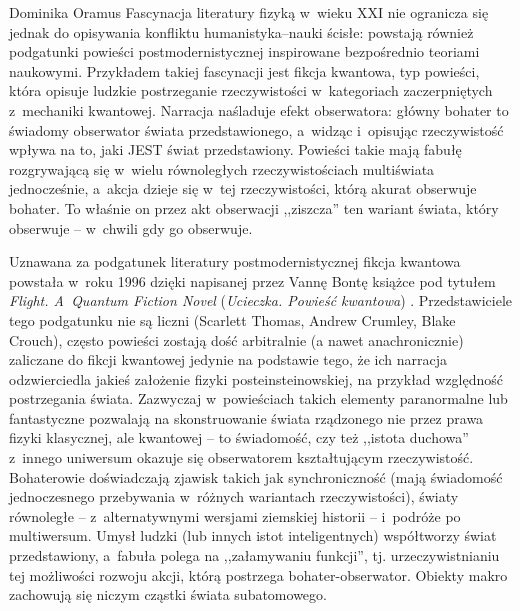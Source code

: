 \begin{artplenv}{Dominika Oramus}
Fascynacja literatury fizyką w~wieku XXI nie ogranicza się jednak do opisywania konfliktu humanistyka--nauki ścisłe: powstają również podgatunki powieści postmodernistycznej inspirowane bezpośrednio teoriami naukowymi. Przykładem takiej fascynacji jest fikcja kwantowa, typ powieści, która opisuje ludzkie postrzeganie rzeczywistości w~kategoriach zaczerpniętych z~mechaniki kwantowej. Narracja naśladuje efekt obserwatora: główny bohater to świadomy obserwator świata przedstawionego, a~widząc i~opisując rzeczywistość wpływa na to, jaki JEST świat przedstawiony. Powieści takie mają fabułę rozgrywającą się w~wielu równoległych rzeczywistościach multiświata jednocześnie, a~akcja dzieje się w~tej rzeczywistości, którą akurat obserwuje bohater. To właśnie on przez akt obserwacji ,,ziszcza'' ten wariant świata, który obserwuje -- w~chwili gdy go obserwuje.

Uznawana za podgatunek literatury postmodernistycznej fikcja kwantowa powstała w~roku 1996 dzięki napisanej przez Vannę Bontę książce pod tytułem \textit{Flight. A~Quantum Fiction Novel} (\textit{Ucieczka. Powieść kwantowa})
\parencite*[][]{brockman_trzecia_1996}. %
 Przedstawiciele tego podgatunku nie są liczni (Scarlett Thomas, Andrew Crumley, Blake Crouch), często powieści zostają dość arbitralnie (a nawet anachronicznie) zaliczane do fikcji kwantowej jedynie na podstawie tego, że ich narracja odzwierciedla jakieś założenie fizyki posteinsteinowskiej, na przykład względność postrzegania świata. Zazwyczaj w~powieściach takich elementy paranormalne lub fantastyczne pozwalają na skonstruowanie świata rządzonego nie przez prawa fizyki klasycznej, ale kwantowej -- to świadomość, czy też ,,istota duchowa'' z~innego uniwersum okazuje się obserwatorem kształtującym rzeczywistość. Bohaterowie doświadczają zjawisk takich jak synchroniczność (mają świadomość jednoczesnego przebywania w~różnych wariantach rzeczywistości), światy równoległe -- z~alternatywnymi wersjami ziemskiej historii -- i~podróże po multiwersum. Umysł ludzki (lub innych istot inteligentnych) współtworzy świat przedstawiony, a~fabuła polega na ,,załamywaniu funkcji'', tj. urzeczywistnianiu tej możliwości rozwoju akcji, którą postrzega bohater-obserwator. Obiekty makro zachowują się niczym cząstki świata subatomowego.


\end{artplenv}
